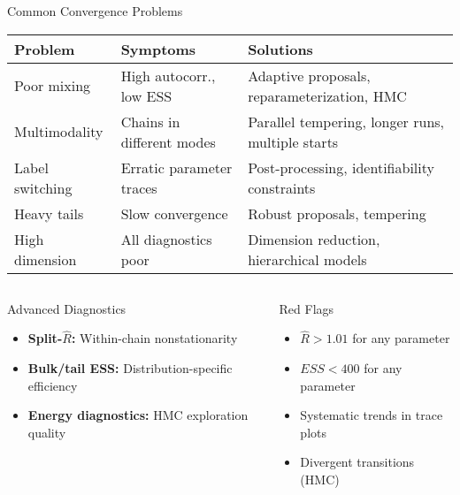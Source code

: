 \documentclass[aspectratio=169,11pt]{beamer}
\begin{document}
\begin{frame}{Common Convergence Problems}
\begin{table}
\centering
\begin{tabular}{p{2.5cm}p{3cm}p{5cm}}
\toprule
\textbf{Problem} & \textbf{Symptoms} & \textbf{Solutions} \\
\midrule
Poor mixing & High autocorr., low ESS & Adaptive proposals, reparameterization, HMC \\
\midrule
Multimodality & Chains in different modes & Parallel tempering, longer runs, multiple starts \\
\midrule
Label switching & Erratic parameter traces & Post-processing, identifiability constraints \\
\midrule
Heavy tails & Slow convergence & Robust proposals, tempering \\
\midrule
High dimension & All diagnostics poor & Dimension reduction, hierarchical models \\
\bottomrule
\end{tabular}
\end{table}

\vspace{0.3cm}
\begin{columns}
\begin{column}{0.5\textwidth}
\begin{block}{Advanced Diagnostics}
\begin{itemize}
\item \textbf{Split-$\hat{R}$:} Within-chain nonstationarity
\item \textbf{Bulk/tail ESS:} Distribution-specific efficiency
\item \textbf{Energy diagnostics:} HMC exploration quality
\end{itemize}
\end{block}
\end{column}
\begin{column}{0.5\textwidth}
\begin{alertblock}{Red Flags}
\begin{itemize}
\item $\hat{R} > 1.01$ for any parameter
\item $ESS < 400$ for any parameter
\item Systematic trends in trace plots
\item Divergent transitions (HMC)
\end{itemize}
\end{alertblock}
\end{column}
\end{columns}
\end{frame}
\end{document}

